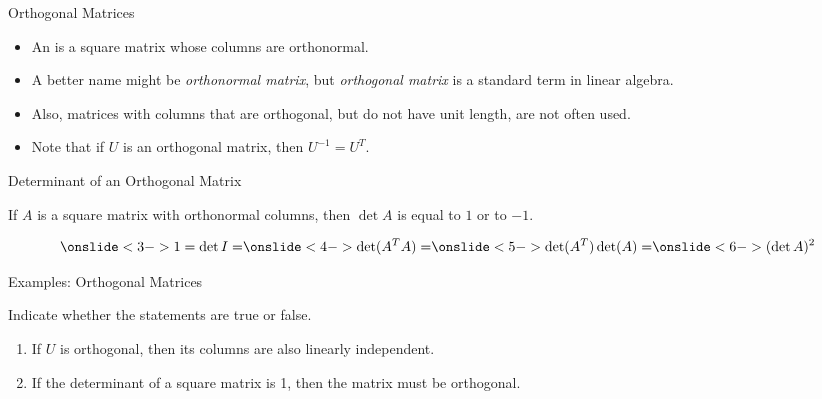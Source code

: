 \begin{frame}{Orthogonal Matrices}

    \begin{itemize}
        \item<2-> An  is a square matrix whose columns are orthonormal.
        \item<3-> A better name might be \textit{orthonormal matrix}, but \textit{orthogonal matrix} is a standard term in linear algebra. 
        \item<4-> Also, matrices with columns that are orthogonal, but do not have unit length, are not often used. 
        \item<5-> Note that if $U$ is an orthogonal matrix, then $U^{-1} = U^T$. 
    \end{itemize}


\end{frame}

\begin{frame}{Determinant of an Orthogonal Matrix}

    If $A$ is a square matrix with orthonormal columns, then $\det A$ is equal to $1$ or to $-1$. 

    \vspace{12pt}
    
    \begin{align*}
        \onslide<3->{1 = \det I = } 
        \onslide<4->{\det(A^TA) =} 
        \onslide<5->{\det(A^T)\det(A) =}
        \onslide<6->{(\det A)^2}
    \end{align*}
    
\end{frame}


\begin{frame}{Examples: Orthogonal Matrices}  

    Indicate whether the statements are true or false.
    \begin{enumerate}

    \item If $U$ is orthogonal, then its columns are also linearly independent. 

    \item If the determinant of a square matrix is 1, then the matrix must be orthogonal.  
    
    \end{enumerate}
\end{frame}

